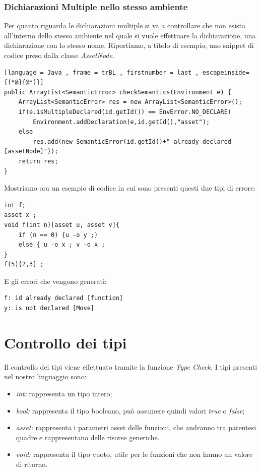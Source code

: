 \documentclass[12pt, a4paper]{report}
\begin{document}
\subsection{Dichiarazioni Multiple nello stesso ambiente}
Per quanto riguarda le dichiarazioni multiple si va a controllare che non esista all'interno dello stesso ambiente nel quale si vuole effettuare la dichiarazione, una dichiarazione con lo stesso nome. Riportiamo, a titolo di esempio, uno snippet di codice preso dalla classe \emph{AssetNode}.
\begin{lstlisting}[language = Java , frame = trBL , firstnumber = last , escapeinside={(*@}{@*)}]
public ArrayList<SemanticError> checkSemantics(Environment e) {
    ArrayList<SemanticError> res = new ArrayList<SemanticError>();
    if(e.isMultipleDeclared(id.getId()) == EnvError.NO_DECLARE)
        Environment.addDeclaration(e,id.getId(),"asset");
    else
        res.add(new SemanticError(id.getId()+" already declared [assetNode]"));
    return res;
}
\end{lstlisting}
Mostriamo ora un esempio di codice in cui sono presenti questi due tipi di errore:
\begin{lstlisting}
int f;
asset x ;
void f(int n)[asset u, asset v]{
    if (n == 0) {u -o y ;}
    else { u -o x ; v -o x ;
}
f(5)[2,3] ;
\end{lstlisting}
E gli errori che vengono generati:
\begin{lstlisting}
f: id already declared [function]
y: is not declared [Move]
\end{lstlisting}

\chapter{Controllo dei tipi}
Il controllo dei tipi viene effettuato tramite la funzione \emph{Type Check.} I tipi presenti nel nostro linguaggio sono:
\begin{itemize}
    \item \emph{int:} rappresenta un tipo intero;
    \item \emph{bool:} rappresenta il tipo booleano, può assumere quindi valori \emph{true} o \emph{false};
    \item \emph{asset:} rappresenta i parametri asset delle funzioni, che andranno tra parentesi quadre e rappresentano delle risorse generiche.
    \item \emph{void:} rappresenta il tipo vuoto, utile per le funzioni che non hanno un valore di ritorno. 
\end{itemize}
\end{document}
